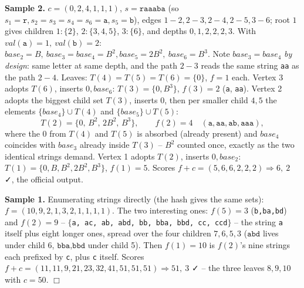 \begin{tracebox}
\textbf{Sample 2.} \(c=(0,2,4,1,1,1)\), \(s=\texttt{raaaba}\) (so
\(s_1{=}\texttt r, s_2{=}s_3{=}s_4{=}s_6{=}\texttt a, s_5{=}\texttt b\)), edges
\(1\!-\!2,2\!-\!3,2\!-\!4,2\!-\!5,3\!-\!6\); root \(1\) gives children
\(1\!:\!\{2\}\), \(2\!:\!\{3,4,5\}\), \(3\!:\!\{6\}\), and depths
\(0,1,2,2,2,3\).  With \(\mathit{val}(\texttt a){=}1,\ \mathit{val}(\texttt b){=}2\):
\(\mathit{base}_2{=}B,\ \mathit{base}_3{=}\mathit{base}_4{=}B^{2},
\mathit{base}_5{=}2B^{2},\ \mathit{base}_6{=}B^{3}\).  Note
\(\mathit{base}_3{=}\mathit{base}_4\) \emph{by design}: same letter at same depth,
and the path \(2\!-\!3\) reads the same string \texttt{aa} as the path \(2\!-\!4\).
Leaves: \(T(4)=T(5)=T(6)=\{0\}\), \(f=1\) each.  Vertex 3 adopts \(T(6)\), inserts
\(0,\mathit{base}_6\): \(T(3)=\{0,B^{3}\}\), \(f(3)=2\) (\texttt{a}, \texttt{aa}).
Vertex 2 adopts the biggest child set \(T(3)\), inserts \(0\), then per smaller
child \(4,5\) the elements \(\{\mathit{base}_4\}\cup T(4)\) and
\(\{\mathit{base}_5\}\cup T(5)\):
\[ T(2)=\{0,\,B^{2},\,2B^{2},\,B^{3}\},\qquad f(2)=4
\quad(\texttt{a},\texttt{aa},\texttt{ab},\texttt{aaa}), \]
where the \(0\) from \(T(4)\) and \(T(5)\) is absorbed (already present) and
\(\mathit{base}_4\) coincides with \(\mathit{base}_3\) already inside \(T(3)\) --
\(B^{2}\) counted once, exactly as the two identical strings demand.  Vertex 1
adopts \(T(2)\), inserts \(0,\mathit{base}_2\): \(T(1)=\{0,B,B^{2},2B^{2},B^{3}\}\),
\(f(1)=5\).  Scores \(f+c=(5,6,6,2,2,2)\Rightarrow\boxed{6,\ 2}\) ✓, the official
output.

\textbf{Sample 1.} Enumerating strings directly (the hash gives the same sets):
\(f=(10,9,2,1,3,2,1,1,1,1)\).  The two interesting ones:
\(f(5)=3\) (\texttt{b,ba,bd}) and \(f(2)=9\) --
\(\{\)\texttt{a, ac, ab, abd, bb, bba, bbd, cc, ccd}\(\}\) -- the string
\texttt{a} itself plus eight longer ones, spread over the four children
\(7,6,5,3\) (\(\texttt{abd}\) lives under child 6, \(\texttt{bba,bbd}\) under
child 5).  Then \(f(1)=10\) is \(f(2)\)'s
nine strings each prefixed by \texttt{c}, plus \texttt{c} itself.  Scores
\(f+c=(11,11,9,21,23,32,41,51,51,51)\Rightarrow\boxed{51,\ 3}\) ✓ -- the three
leaves \(8,9,10\) with \(c=50\).  \(\Box\)
\end{tracebox}

